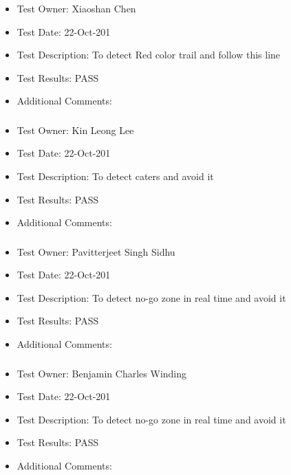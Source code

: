 \documentclass[10pt,a4paper,titlepage]{article}
\begin{document}
\subsubsection{}
\begin{itemize}
	\item Test Owner:  Xiaoshan Chen
	\item Test Date: 22-Oct-201
	\item Test Description: To detect Red color trail and follow this line
	\item Test Results: PASS
	\item Additional Comments:	
\end{itemize}

\subsubsection{}
\begin{itemize}
	\item Test Owner:  Kin Leong Lee
	\item Test Date: 22-Oct-201
	\item Test Description: To detect caters and avoid it
	\item Test Results: PASS
	\item Additional Comments:
	
\end{itemize}

\subsubsection{}
\begin{itemize}
	\item Test Owner:  Pavitterjeet Singh Sidhu
	\item Test Date: 22-Oct-201
	\item Test Description: To detect no-go zone in real time and avoid it
	\item Test Results: PASS
	\item Additional Comments:	
\end{itemize}

\subsubsection{}
\begin{itemize}
	\item Test Owner: Benjamin Charles Winding
	\item Test Date: 22-Oct-201
	\item Test Description: To detect no-go zone in real time and avoid it
	\item Test Results: PASS
	\item Additional Comments:
	
\end{itemize}
\end{document}
